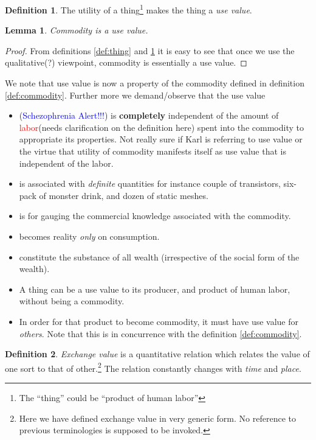 \documentclass[12pt]{extarticle}
\newtheorem{lemma}[theorem]{Lemma}
\theoremstyle{definition}
\newtheorem{definition}{Definition}[section]
\newenvironment{remark}[1][Remark]{\begin{trivlist}
\item[\hskip \labelsep {\bfseries #1}]}{\end{trivlist}}
\begin{document}
\begin{definition}
  \label{def:usevalue}
  The utility of a thing\footnote{The ``thing'' could be ``product of human labor''} makes the thing a \emph{use value}.
  \end{definition}

  \begin{lemma}
    Commodity is a use value.
    \end{lemma}
  \begin{proof}
    From definitions \ref{def:thing} and \ref{def:usevalue} it is easy to see that once we use the qualitative(?) viewpoint, commodity is essentially a use value.
  \end{proof}
  \begin{remark}
    We note that use value is now a property of the commodity defined in definition \ref{def:commodity}.  Further more we demand/observe that the use value
    \begin{itemize}
    \item (\textcolor{blue}{Schezophrenia Alert!!!}) is \textbf{completely} independent of the amount of \textcolor{red}{labor}(needs clarification on the definition here) spent into the commodity to appropriate its properties.  Not really sure if Karl is referring to use value or the virtue that utility of commodity manifests itself as use value that is independent of the labor.
    \item  is associated with \emph{definite} quantities for instance couple of transistors, six-pack of monster drink, and dozen of static meshes.
    \item is for gauging the commercial knowledge associated with the commodity.
    \item becomes reality \emph{only} on consumption.
    \item constitute the substance of all wealth (irrespective of the social form of the wealth).
    \item A thing can be a use value to its producer, and product of human labor, without being a commodity.
      \item In order for that product to become commodity, it must have use value for \emph{others}.  Note that this is in concurrence with the definition \ref{def:commodity}.
    \end{itemize}
  \end{remark}

  \begin{definition}
    \label{def:exchval}
    \emph{Exchange value} is a quantitative relation which relates the value of one sort to that of other.\footnote{Here we have defined exchange value in very generic form.  No reference to previous terminologies is supposed to be invoked.}  The relation constantly changes with \emph{time} and \emph{place}.
  \end{definition}
\end{document}
